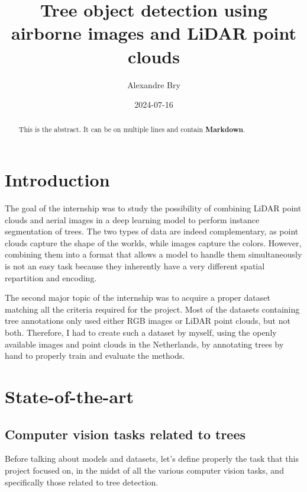 \documentclass[
]{report}
\title{Tree object detection using airborne images and LiDAR point
clouds}
\author{Alexandre Bry}
\date{2024-07-16}
\renewcommand*\contentsname{Table of contents}
\newcommand\contentsname{Table of contents}
\begin{document}
\maketitle
\begin{abstract}
This is the abstract. It can be on multiple lines and contain
\textbf{Markdown}.
\end{abstract}

\renewcommand*\contentsname{Table of contents}
{
\hypersetup{linkcolor=}
\setcounter{tocdepth}{2}
\tableofcontents
}

\chapter*{Introduction}\label{introduction}

The goal of the internship was to study the possibility of combining
LiDAR point clouds and aerial images in a deep learning model to perform
instance segmentation of trees. The two types of data are indeed
complementary, as point clouds capture the shape of the worlds, while
images capture the colors. However, combining them into a format that
allows a model to handle them simultaneously is not an easy task because
they inherently have a very different spatial repartition and encoding.

The second major topic of the internship was to acquire a proper dataset
matching all the criteria required for the project. Most of the datasets
containing tree annotations only used either RGB images or LiDAR point
clouds, but not both. Therefore, I had to create such a dataset by
myself, using the openly available images and point clouds in the
Netherlands, by annotating trees by hand to properly train and evaluate
the methods.

\chapter{State-of-the-art}\label{state-of-the-art}

\section{Computer vision tasks related to
trees}\label{computer-vision-tasks-related-to-trees}

Before talking about models and datasets, let's define properly the task
that this project focused on, in the midst of all the various computer
vision tasks, and specifically those related to tree detection.
\end{document}
